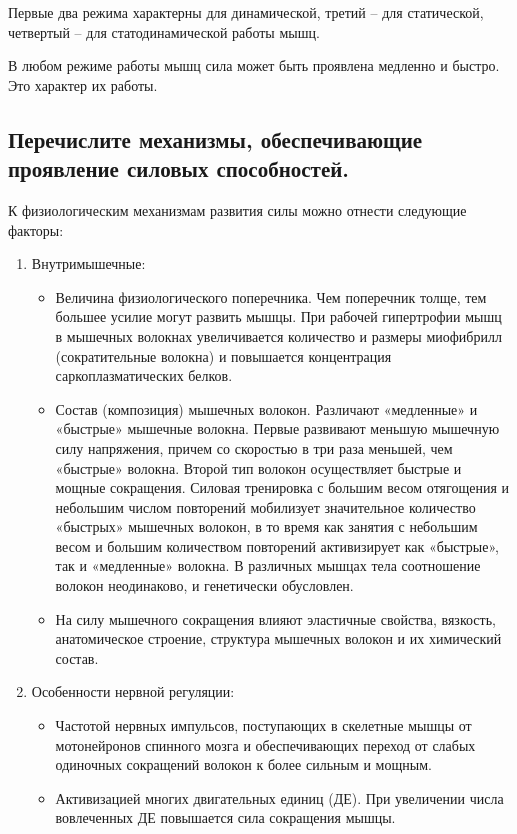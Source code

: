 Первые два режима характерны для динамической, третий – для статической, четвертый – для статодинамической работы мышц.

В любом режиме работы мышц сила может быть проявлена медленно и быстро. Это характер их работы.


\subsection{Перечислите механизмы, обеспечивающие проявление силовых способностей.}

К физиологическим механизмам развития силы можно отнести следующие факторы:
\begin{enumerate}
    \item Внутримышечные:
    \begin{itemize}
        \item Величина физиологического поперечника. Чем поперечник толще, тем большее усилие могут развить мышцы. При рабочей гипертрофии мышц в мышечных волокнах увеличивается количество и размеры миофибрилл (сократительные волокна) и повышается концентрация саркоплазматических белков.
        \item Состав (композиция) мышечных волокон. Различают «медленные» и «быстрые» мышечные волокна. Первые развивают меньшую мышечную силу напряжения, причем со скоростью в три раза меньшей, чем «быстрые» волокна. Второй тип волокон осуществляет быстрые и мощные сокращения. Силовая тренировка с большим весом отягощения и небольшим числом повторений мобилизует значительное количество «быстрых» мышечных волокон, в то время как занятия с небольшим весом и большим количеством повторений активизирует как «быстрые», так и «медленные» волокна. В различных мышцах тела соотношение волокон неодинаково, и генетически обусловлен.
        \item На силу мышечного сокращения влияют эластичные свойства, вязкость, анатомическое строение, структура мышечных волокон и их химический состав.
    \end{itemize}
    \item Особенности нервной регуляции:
    \begin{itemize}
        \item Частотой нервных импульсов, поступающих в скелетные мышцы от мотонейронов спинного мозга и обеспечивающих переход от слабых одиночных сокращений волокон к более сильным и мощным.
        \item Активизацией многих двигательных единиц (ДЕ). При увеличении числа вовлеченных ДЕ повышается сила сокращения мышцы.

\end{itemize}
\end{enumerate}
